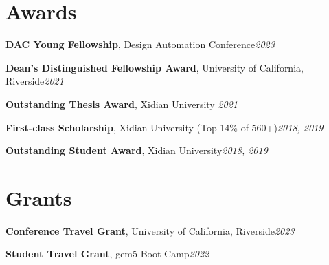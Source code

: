 \documentclass[letterpaper,11pt]{article}
\newcommand{\resumeSubHeadingListStart}{\begin{itemize}[leftmargin=0.15in, label={}]}
\newcommand{\resumeSubHeadingListEnd}{\end{itemize}}
\begin{document}
\section{Awards}
  \vspace{2pt}
  \resumeSubHeadingListStart
    \small{\item{
        \textbf{DAC Young Fellowship}, Design Automation Conference\hfill \textit{2023} \\ \vspace{3pt}
    
        \textbf{Dean’s Distinguished Fellowship Award}, University of California, Riverside\hfill \textit{2021} \\ \vspace{3pt}
        
        \textbf{Outstanding Thesis Award}, Xidian University \hfill \textit{2021} \\ \vspace{3pt}
        
        \textbf{First-class Scholarship}, Xidian University (Top 14\% of 560+)\hfill \textit{2018, 2019} \\ \vspace{3pt}
        
        \textbf{Outstanding Student Award}, Xidian University\hfill \textit{2018, 2019} \\ \vspace{3pt}
    }}
  \resumeSubHeadingListEnd

\section{Grants}
  \vspace{2pt}
  \resumeSubHeadingListStart
    \small{\item{

        \textbf{Conference Travel Grant}, University of California, Riverside\hfill \textit{2023} \\ \vspace{3pt}

        \textbf{Student Travel Grant}, gem5 Boot Camp\hfill \textit{2022} \\ \vspace{3pt}
        
    }}
  \resumeSubHeadingListEnd




      
\end{document}
